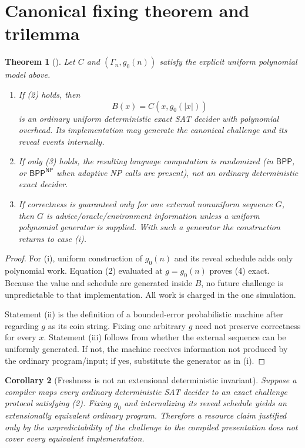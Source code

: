 \documentclass[11pt]{article}
\newtheorem{theorem}{Theorem}
\newtheorem{corollary}[theorem]{Corollary}
\newcommand{\claim}[1]{\texttt{\detokenize{#1}}}
\begin{document}
\section{Canonical fixing theorem and trilemma}

\begin{theorem}[\claim{EXOGENOUS-CHALLENGE-MODEL-TRILEMMA1}]
Let $C$ and $(\Gamma_n,g_0(n))$ satisfy the explicit uniform polynomial model
above.
\begin{enumerate}[label=(\roman*)]
\item If (2) holds, then
\[
                    B(x)=C(x,g_0(|x|))                       \tag{4}
\]
is an ordinary uniform deterministic exact SAT decider with polynomial
overhead.  Its implementation may generate the canonical challenge and its
reveal events internally.
\item If only (3) holds, the resulting language computation is randomized
(in $\mathsf{BPP}$, or $\mathsf{BPP}^{\mathsf{NP}}$ when adaptive NP calls
are present), not an ordinary deterministic exact decider.
\item If correctness is guaranteed only for one external nonuniform sequence
$G$, then $G$ is advice/oracle/environment information unless a uniform
polynomial generator is supplied.  With such a generator the construction
returns to case (i).
\end{enumerate}
\end{theorem}

\begin{proof}
For (i), uniform construction of $g_0(n)$ and its reveal schedule adds only
polynomial work.  Equation (2) evaluated at $g=g_0(n)$ proves (4) exact.
Because the value and schedule are generated inside $B$, no future challenge
is unpredictable to that implementation.  All work is charged in the one
simulation.

Statement (ii) is the definition of a bounded-error probabilistic machine
after regarding $g$ as its coin string.  Fixing one arbitrary $g$ need not
preserve correctness for every $x$.  Statement (iii) follows from whether the
external sequence can be uniformly generated.  If not, the machine receives
information not produced by the ordinary program/input; if yes, substitute
the generator as in (i).
\end{proof}

\begin{corollary}[Freshness is not an extensional deterministic invariant]
Suppose a compiler maps every ordinary deterministic SAT decider to an exact
challenge protocol satisfying (2).  Fixing $g_0$ and internalizing its reveal
schedule yields an extensionally equivalent ordinary program.  Therefore a
resource claim justified only by the unpredictability of the challenge to the
compiled presentation does not cover every equivalent implementation.
\end{corollary}
\end{document}

